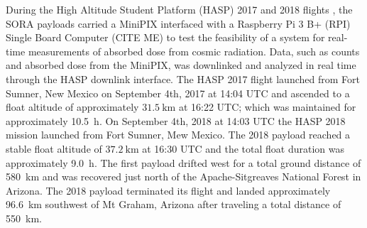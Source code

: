 During the High Altitude Student Platform (HASP) 2017 and 2018 flights \cite{hasp}, the SORA payloads carried a MiniPIX interfaced with a Raspberry Pi 3 B+ (RPI) Single Board Computer (CITE ME) to test the feasibility of a system for real-time measurements of absorbed dose from cosmic radiation. Data, such as counts and absorbed dose from the MiniPIX, was downlinked and analyzed in real time through the HASP downlink interface. The HASP 2017 flight launched from Fort Sumner, New Mexico on September 4th, 2017 at 14:04 UTC and ascended to a float altitude of approximately $\SI{31.5}{\kilo\meter}$ at 16:22 UTC; which was maintained for approximately \SI{10.5}{\hour}. On September 4th, 2018 at 14:03 UTC the HASP 2018 mission launched from Fort Sumner, Mew Mexico.  The 2018 payload reached a stable float altitude of $\SI{37.2}{\kilo\meter}$ at 16:30 UTC and the total float duration was approximately \SI{9.0}{\hour}. The first payload drifted west for a total ground distance of \SI{580}{\kilo\meter} and was recovered just north of the Apache-Sitgreaves National Forest in Arizona. The 2018 payload terminated its flight and landed approximately \SI{96.6}{\kilo\meter} southwest of Mt Graham, Arizona after traveling a total distance of \SI{550}{\kilo\meter}.
%
%
%
%
%
%
%
%
%


